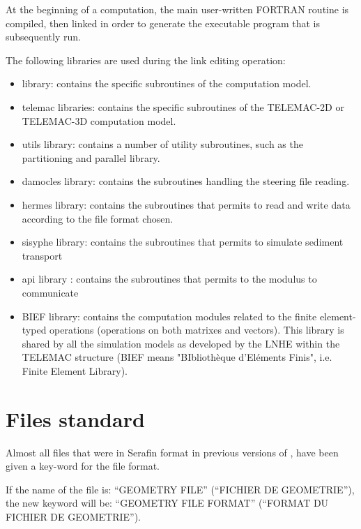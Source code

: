 At the beginning of a computation, the main user-written FORTRAN routine is compiled,
then linked in order to generate the executable program that is subsequently run.

 The following libraries are used during the link editing operation:

\begin{itemize}
\item  \tomawac library: contains the specific subroutines of the \tomawac computation
  model.

\item  telemac libraries: contains the specific subroutines of the TELEMAC-2D or
  TELEMAC-3D computation model.

\item  utils library: contains a number of utility subroutines, such as the partitioning
  and parallel library.

\item  damocles library: contains the subroutines handling the steering file reading.

\item  hermes library: contains the subroutines that permits to read and write data
  according to the file format chosen.

\item  sisyphe library: contains the subroutines that permits to simulate sediment
  transport

\item  api library : contains the subroutines that permits to the modulus to communicate

\item  BIEF library: contains the computation modules related to the finite
  element-typed operations (operations on both matrixes and vectors). This library is
  shared by all the simulation models as developed by the LNHE within the TELEMAC
  structure (BIEF means "BIbliothèque d'Eléments Finis", i.e. Finite Element Library).
\end{itemize}



\section{ Files standard}

Almost all files that were in Serafin format in previous versions of \tomawac, have
been given a key-word for the file format.

If the name of the file is: ``GEOMETRY FILE'' (``FICHIER DE GEOMETRIE''), the new
keyword will be: ``GEOMETRY FILE FORMAT'' (``FORMAT DU FICHIER DE GEOMETRIE'').

